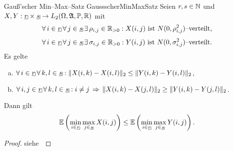 \begin{satz}{Gauß'scher Min--Max--Satz}
            {GaussscherMinMaxSatz}
Seien $r, s \in \mathbb{N}$ und 
$X, Y: \haken r \times \haken s \rightarrow L_2(\Omega, \mfa, \Prim, \R)$
mit 
\[\forall\,i\in\haken r\,\forall\,j\in\haken s\,\exists\,\rho_{i,j}\in\R_{>0}:
X(i, j) \text{ ist }N(0, \rho_{i,j}^2)\text{--verteilt,}\]
\[
\forall\,i\in\haken r\,\forall\,j\in\haken s\,
\exists\,\sigma_{i,j}\in\R_{>0}:
Y(i, j) \text{ ist }N(0, \sigma_{i,j}^2)\text{--verteilt.}\]
Es gelte
\begin{enumerate}[(a)]
	\item $\forall\, i \in \haken r \, \forall\, k,l \in \haken s:
	\norm{X(i,k)-X(i,l)}_2 \le \norm{Y(i,k)-Y(i,l)}_2$,
	\item $\forall\, i, j \in \haken r\,\forall\, k, l \in \haken s:
i \neq j \folgt \norm{X(i,k)-X(j,l)}_2 \ge \norm{Y(i,k)-Y(j,l)}_2$.
\end{enumerate}
Dann gilt
\[\E\left(\min_{i \in \haken r}\max_{j \in \haken s}X(i,j) \right)
\le\E\left(\min_{i \in \haken r}\max_{j \in \haken s}Y(i,j) \right)\text.\]
\end{satz}
\begin{proof}
siehe~\cite{Gor}
\end{proof}
